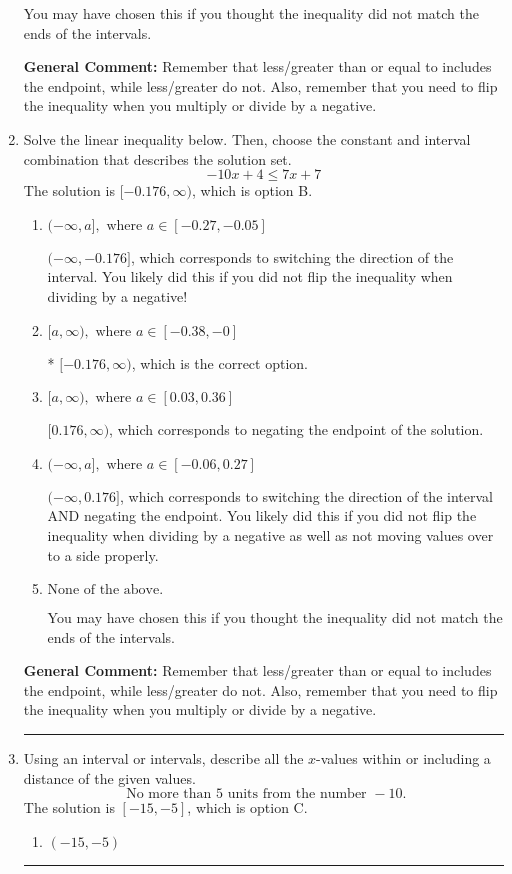 \documentclass{extbook}[14pt]
\newcommand{\litem}[1]{\item #1

\rule{\textwidth}{0.4pt}}
\begin{document}
\begin{enumerate}
{\begin{enumerate}[label=\Alph*.]
You may have chosen this if you thought the inequality did not match the ends of the intervals.
\end{enumerate}

\textbf{General Comment:} Remember that less/greater than or equal to includes the endpoint, while less/greater do not. Also, remember that you need to flip the inequality when you multiply or divide by a negative.
}
\litem{
Solve the linear inequality below. Then, choose the constant and interval combination that describes the solution set.
\[ -10x + 4 \leq 7x + 7 \]The solution is \( [-0.176, \infty) \), which is option B.\begin{enumerate}[label=\Alph*.]
\item \( (-\infty, a], \text{ where } a \in [-0.27, -0.05] \)

 $(-\infty, -0.176]$, which corresponds to switching the direction of the interval. You likely did this if you did not flip the inequality when dividing by a negative!
\item \( [a, \infty), \text{ where } a \in [-0.38, -0] \)

* $[-0.176, \infty)$, which is the correct option.
\item \( [a, \infty), \text{ where } a \in [0.03, 0.36] \)

 $[0.176, \infty)$, which corresponds to negating the endpoint of the solution.
\item \( (-\infty, a], \text{ where } a \in [-0.06, 0.27] \)

 $(-\infty, 0.176]$, which corresponds to switching the direction of the interval AND negating the endpoint. You likely did this if you did not flip the inequality when dividing by a negative as well as not moving values over to a side properly.
\item \( \text{None of the above}. \)

You may have chosen this if you thought the inequality did not match the ends of the intervals.
\end{enumerate}

\textbf{General Comment:} Remember that less/greater than or equal to includes the endpoint, while less/greater do not. Also, remember that you need to flip the inequality when you multiply or divide by a negative.
}
\litem{
Using an interval or intervals, describe all the $x$-values within or including a distance of the given values.
\[ \text{ No more than } 5 \text{ units from the number } -10. \]The solution is \( [-15, -5] \), which is option C.\begin{enumerate}[label=\Alph*.]
\item \( (-15, -5) \)


\end{enumerate}}
\end{enumerate}
\end{document}
